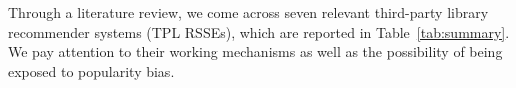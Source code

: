









Through a literature review, we come across seven relevant third-party library recommender systems (TPL RSSEs), which are reported in %
Table~\ref{tab:summary}. We pay attention to their working mechanisms as well as the possibility of being exposed to popularity bias. 

